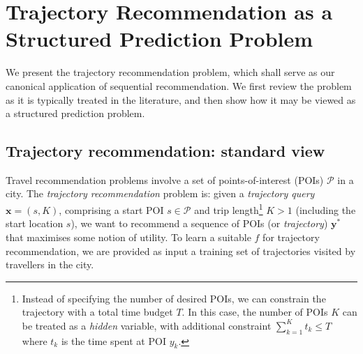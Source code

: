 
\section{Trajectory Recommendation as a Structured Prediction Problem}
\label{sec:trajrec}

We present the trajectory recommendation problem,
which shall serve as our canonical application of sequential recommendation.
We first review the problem as it is typically treated in the literature,
and then show how it may be viewed as a structured prediction problem.

%
\subsection{Trajectory recommendation: standard view}

Travel recommendation problems involve a set of points-of-interest (POIs) $\mathcal{P}$ in a city.
The \emph{trajectory recommendation} problem is: given a \emph{trajectory query} $\mathbf{x} = (s, K)$,
comprising a start POI $s \in \mathcal{P}$ and trip length\footnote{Instead of specifying the number of desired POIs, we can constrain the trajectory with a total time budget $T$. In this case, the number of POIs $K$ can be treated as a \emph{hidden} variable, with additional constraint $\sum_{k=1}^K t_k \le T$ where $t_k$ is the time spent at POI $y_k$.}
$K > 1$ (including the start location $s$),
we want to recommend a sequence of POIs (or \emph{trajectory}) $\mathbf{y}^*$ that maximises some notion of utility.
To learn a suitable $f$ for trajectory recommendation,
we are provided as input a training set
of trajectories visited by travellers in the city.

%

